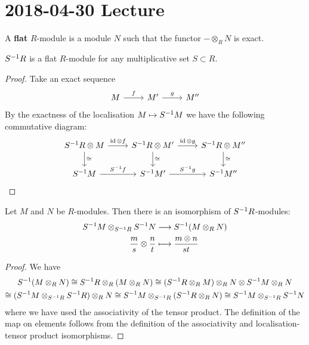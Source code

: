 \section{2018-04-30 Lecture}

\begin{defn}
  A \textbf{flat} $R$-module is a module $N$ such that the functor $-\otimes_R N$ is exact.
\end{defn}

\begin{cor}[2.10]
  $S^{-1} R$ is a flat $R$-module for any multiplicative set $S \subset R$.
\end{cor}

\begin{proof}
  Take an exact sequence
  \begin{equation*}
    \begin{tikzcd}
      M \ar[r, "f"] & M' \ar[r, "g"] & M''
    \end{tikzcd}
  \end{equation*}
  By the exactness of the localisation $M \mapsto S^{-1} M$ we have the following commutative diagram:
  \begin{equation*}
    \begin{tikzcd}
      S\inv R \otimes M \ar[r, "\id \otimes f"] \ar[d, "\cong"] & S\inv R \otimes M' \ar[r, "\id \otimes g"] \ar[d, "\cong"] & S\inv R \otimes M'' \ar[d, "\cong"] \\
      S\inv M \ar[r, "S\inv f"] & S\inv M' \ar[r, "S\inv g"] & S\inv M''
    \end{tikzcd}
    \qedhere
  \end{equation*}
\end{proof}

\begin{prop}[2.11]
  Let $M$ and $N$ be $R$-modules.
  Then there is an isomorphism of $S^{-1} R$-modules:
  \begin{align*}
    S^{-1} M \otimes_{S^{-1} R} S^{-1} N &\longrightarrow S^{-1}(M \otimes_R N) \\
    \frac ms \otimes \frac nt &\longmapsto \frac{m \otimes n}{st}
  \end{align*}
\end{prop}

\begin{proof}
  We have
  \begin{multline*}
    S^{-1} (M \otimes_R N) \cong S^{-1} R \otimes_R (M \otimes_R N) \cong (S^{-1} R \otimes_R M) \otimes_R N \otimes S^{-1} M \otimes_R N \\
    \cong (S^{-1} M \otimes_{S^{-1} R} S^{-1} R) \otimes_R N \cong S^{-1} M \otimes_{S^{-1} R} (S^{-1} R \otimes_R N) \cong S^{-1} M \otimes_{S^{-1} R} S^{-1} N
  \end{multline*}
  where we have used the associativity of the tensor product.
  The definition of the map on elements follows from the definition of the associativity and localisation-tensor product isomorphisms.
\end{proof}

